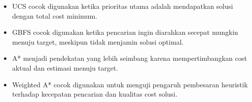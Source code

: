 \begin{tcolorbox}[
	colback=purple!5,
	colframe=purple!60!black,
	title=\textbf{Ringkasan Pemilihan Algoritma},
	arc=2mm,
	boxrule=0.8pt
]
\begin{itemize}
	\item UCS cocok digunakan ketika prioritas utama adalah mendapatkan solusi dengan total cost minimum.
	\item GBFS cocok digunakan ketika pencarian ingin diarahkan secepat mungkin menuju target, meskipun tidak menjamin solusi optimal.
	\item A* menjadi pendekatan yang lebih seimbang karena mempertimbangkan cost aktual dan estimasi menuju target.
	\item Weighted A* cocok digunakan untuk menguji pengaruh pembesaran heuristik terhadap kecepatan pencarian dan kualitas cost solusi.
\end{itemize}
\end{tcolorbox}